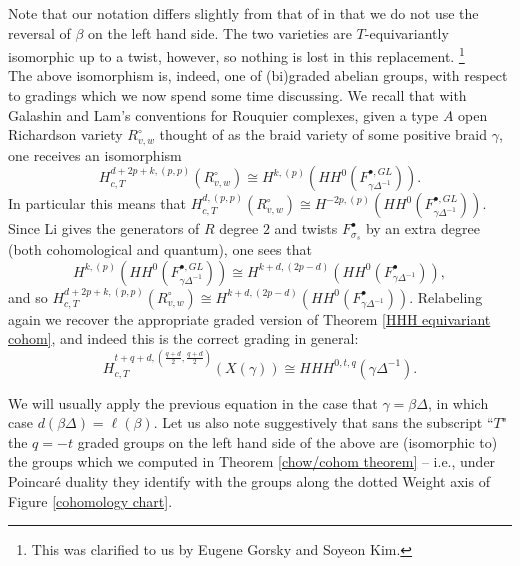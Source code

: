 \documentclass[11pt]{amsart}
\theoremstyle{definition}
\theoremstyle{remark}
\numberwithin{equation}{section}
\begin{document}
Note that our notation differs slightly from that of \cite{MR5110495} in that we do not use the reversal of $\beta$ on the left hand side. The two varieties are $T$-equivariantly isomorphic up to a twist, however, so nothing is lost in this replacement. \footnote{This was clarified to us by Eugene Gorsky and Soyeon Kim.}\\

The above isomorphism is, indeed, one of (bi)graded abelian groups, with respect to gradings which we now spend some time discussing. We recall that with Galashin and Lam's conventions for Rouquier complexes, given a type $A$ open Richardson variety $R_{v, w}^\circ$ thought of as the braid variety of some positive braid $\gamma$, one receives an isomorphism \begin{equation}
    H_{c, T}^{d + 2p + k, (p, p)}(R_{v, w}^\circ) \cong H^{k, (p)}(HH^0(F_{\gamma \Delta^{-1}}^{\bullet, GL})).
\end{equation}
In particular this means that $H^{d, (p, p)}_{c, T}(R_{v,w}^\circ) \cong H^{-2p, (p)}(HH^0(F_{\gamma \Delta^{-1}}^{\bullet, GL}))$. Since Li gives the generators of $R$ degree $2$ and twists $F_{\sigma_s}^\bullet$ by an extra degree (both cohomological and quantum), one sees that \begin{equation}
    H^{k,(p)}(HH^0(F_{\gamma \Delta^{-1}}^{\bullet, GL})) \cong H^{k + d, (2p - d)}(HH^0(F_{\gamma \Delta^{-1}}^\bullet)),
\end{equation}
\noindent and so $H^{d + 2p +k, (p, p)}_{c, T}(R_{v, w}^\circ) \cong H^{k + d, (2p - d)}(HH^0(F_{\gamma \Delta^{-1}}^\bullet))$. Relabeling again we recover the appropriate graded version of Theorem \ref{HHH equivariant cohom}, and indeed this is the correct grading in general: \begin{equation}
   H^{t + q + d, (\frac{q + d}{2}, \frac{q + d}{2})}_{c, T}(X(\gamma)) \cong HHH^{0, t, q}(\gamma \Delta^{-1}).
\end{equation}

We will usually apply the previous equation in the case that $\gamma = \beta \Delta$, in which case $d(\beta \Delta) = \ell(\beta)$. Let us also note suggestively that sans the subscript ``$T$" the $q = -t$ graded groups on the left hand side of the above are (isomorphic to) the groups which we computed in Theorem \ref{chow/cohom theorem} -- i.e., under Poincar\'e duality they identify with the groups along the dotted Weight axis of Figure \ref{cohomology chart}.\\
\end{document}
